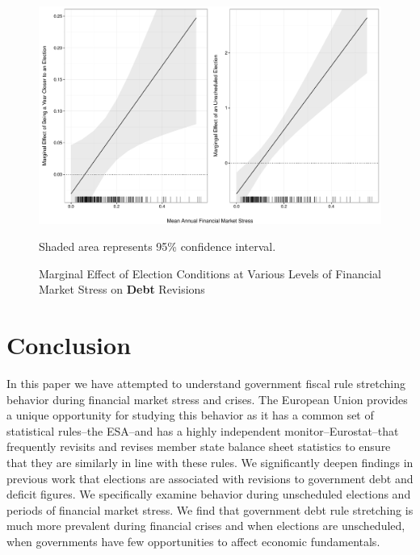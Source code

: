 \documentclass[]{article}
\begin{document}
\begin{figure}
    \caption{Marginal Effect of Election Conditions at Various Levels of Financial Market Stress on \textbf{Debt} Revisions}
    \label{me_finstress_elect}

    \begin{center}
        \includegraphics[scale=0.45]{figures/fsi_elect_me.pdf}
    \end{center}

	{\scriptsize{Shaded area represents 95\% confidence interval.}}

\end{figure}

\begin{landscape}
    
\end{landscape}


\section{Conclusion}

In this paper we have attempted to understand government fiscal rule stretching behavior during financial market stress and crises. The European Union provides a unique opportunity for studying this behavior as it has a common set of statistical rules--the ESA--and has a highly independent monitor--Eurostat--that frequently revisits and revises member state balance sheet statistics to ensure that they are similarly in line with these rules. We significantly deepen findings in previous work that elections are associated with revisions to government debt and deficit figures. We specifically examine behavior during unscheduled elections and periods of financial market stress. We find that government debt rule stretching is much more prevalent during financial crises and when elections are unscheduled, when governments have few opportunities to affect economic fundamentals.
\end{document}
